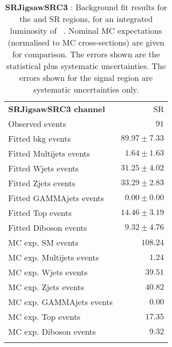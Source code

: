 

\begin{table}
\begin{center}
\setlength{\tabcolsep}{0.0pc}
{\tiny
\begin{tabular*}{\textwidth}{@{\extracolsep{\fill}}lr}
\noalign{\smallskip}\hline\noalign{\smallskip}
{\bf SRJigsawSRC3 channel}           & SR              \\[-0.05cm]
\noalign{\smallskip}\hline\noalign{\smallskip}
Observed events          & $91$                    \\
\noalign{\smallskip}\hline\noalign{\smallskip}
Fitted bkg events         & $89.97 \pm 7.33$              \\
\noalign{\smallskip}\hline\noalign{\smallskip}
        Fitted Multijets events         & $1.64 \pm 1.63$              \\
        Fitted Wjets events         & $31.25 \pm 4.02$              \\
        Fitted Zjets events         & $33.29 \pm 2.83$              \\
        Fitted GAMMAjets events         & $0.00 \pm 0.00$              \\
        Fitted Top events         & $14.46 \pm 3.19$              \\
        Fitted Diboson events         & $9.32 \pm 4.76$              \\
 \noalign{\smallskip}\hline\noalign{\smallskip}
MC exp. SM events              & $108.24$              \\
\noalign{\smallskip}\hline\noalign{\smallskip}
        MC exp. Multijets events         & $1.24$              \\
        MC exp. Wjets events         & $39.51$              \\
        MC exp. Zjets events         & $40.82$              \\
        MC exp. GAMMAjets events         & $0.00$              \\
        MC exp. Top events         & $17.35$              \\
        MC exp. Diboson events         & $9.32$              \\
\noalign{\smallskip}\hline\noalign{\smallskip}
\end{tabular*}
}
\end{center}
\caption{{\bf SRJigsawSRC3} : Background fit results for the  and SR regions, for an integrated luminosity of \ourintlumi~\ifb. Nominal MC expectations (normalised to MC cross-sections) are given for comparison. The errors shown are the statistical plus systematic uncertainties. The errors shown for the signal region are systematic uncertainties only.}
\label{table.results.systematics.in.logL.fit.SR.SRJigsawSRC3}
\end{table}
%